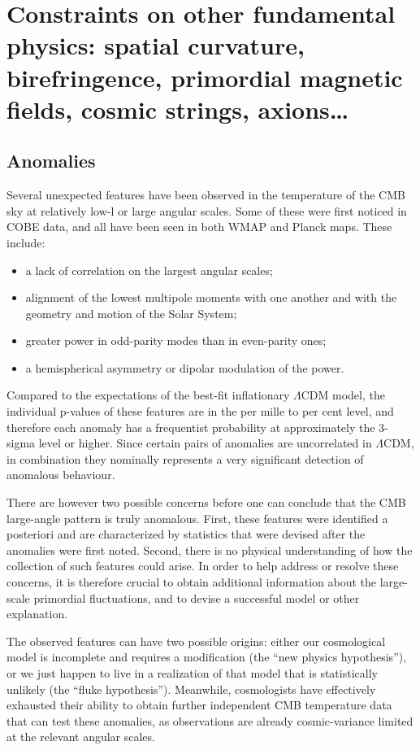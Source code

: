 \section{Constraints on other fundamental physics: spatial curvature, birefringence, primordial magnetic fields, cosmic strings, axions\dots}
\label{sec:other_topics}

\subsection{Anomalies}

Several unexpected features have been observed in the temperature of the CMB sky at relatively low-l or large angular scales.  Some of these were first noticed in COBE data,  
and all have been seen in both WMAP and Planck maps.  These include: 
\begin{itemize}
  \item a lack of correlation on the largest angular scales;
  \item alignment of the lowest multipole moments with one another and with the geometry and motion of the Solar System;
 \item greater power in odd-parity modes than in even-parity ones;
  \item a hemispherical asymmetry or dipolar modulation of the power.
\end{itemize}

Compared to the expectations of the best-fit inflationary $\Lambda$CDM model, the individual p-values of these features are in the per mille to per cent level, and therefore each anomaly has a frequentist probability at approximately the 3-sigma level or higher.  Since certain pairs of anomalies are uncorrelated in $\Lambda$CDM, in combination they nominally represents a very significant detection of anomalous behaviour. 

There are however two possible concerns before one can conclude that the CMB large-angle pattern is truly anomalous. First, these features were identified a posteriori and are characterized by statistics that were devised after the anomalies were first noted. Second, there is no physical understanding of how the collection of such features could arise. In order to help address or resolve these concerns, it is therefore crucial to obtain additional information about the large-scale primordial fluctuations, and to devise a successful model or other explanation.

The observed features can have two possible origins: either our cosmological model is incomplete and requires a modification (the “new physics hypothesis”), or we just happen to live in a realization of that model that is statistically unlikely (the “fluke hypothesis”).   Meanwhile, cosmologists have effectively exhausted their ability to obtain further independent CMB temperature data that can test these anomalies, as observations are already cosmic-variance limited at the relevant angular scales.

